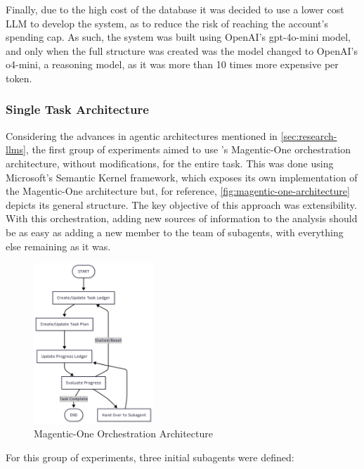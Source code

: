 \documentclass[a4paper]{report}
\begin{document}
Finally, due to the high cost of the database it was decided to use a lower cost LLM to develop the system, as to reduce the risk of reaching the account's spending cap. As such, the system was built using OpenAI's gpt-4o-mini model, and only when the full structure was created was the model changed to OpenAI's o4-mini, a reasoning model, as it was more than 10 times more expensive per token.

\subsubsection{Single Task Architecture}

Considering the advances in agentic architectures mentioned in \autoref{sec:research-llms}, the first group of experiments aimed to use \cite{fourney2024magenticone}'s Magentic-One orchestration architecture, without modifications, for the entire task. This was done using Microsoft's Semantic Kernel framework, which exposes its own implementation of the Magentic-One architecture but, for reference, \autoref{fig:magentic-one-architecture} depicts its general structure. The key objective of this approach was extensibility. With this orchestration, adding new sources of information to the analysis should be as easy as adding a new member to the team of subagents, with everything else remaining as it was.

\begin{figure}[h]
\centering
\includegraphics[width=0.4\textwidth]{images/mangentic-one-simplified.png}
\caption{Magentic-One Orchestration Architecture}
\label{fig:magentic-one-architecture}
\end{figure}

For this group of experiments, three initial subagents were defined:
\end{document}
